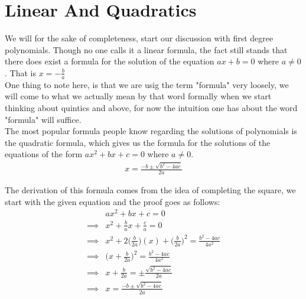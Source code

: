 
\begin{abstract}
The quadratic formula is very well known, slightly less well known are the formulas for the solutions of cubic and quartic equations. In this article we start by discussing the Sridharacharya's quadratic formula and show the proof for Del Ferro-Tartaglia-Cardano method for solving the cubic equation. We also discuss a method for solving quartics different than Ferrari's method. And we lastly we prove a weak Abel-Ruffini theorem which shows the non-existence of a general formula for the solutions of polynomials with degree higher than four. 
\end{abstract}

\articletoc


\section{Linear And Quadratics}

We will for the sake of completeness, start our discussion with first degree polynomials. Though no one calls it a linear formula, the fact still stands that there does exist a formula for the solution of the equation $ax+b=0$ where $a\neq 0$. That is $x=-\frac{b}{a}$\\

One thing to note here, is that we are usig the term "formula" very loosely, we will come to what we actually mean by that word formally when we start thinking about quintics and above, for now the intuition one has about the word "formula" will suffice.\\

The most popular formula people know regarding the solutions of polynomials is the quadratic formula, which gives us the formula for the solutions of the equations of the form $ax^2+bx+c=0$ where $a\neq 0$.\\
\begin{align*}
x=\frac{-b\pm\sqrt{b^2-4ac}}{2a}
\end{align*}

The derivation of this formula comes from the idea of completing the square, we start with the given equation and the proof goes as follows:
\begin{align*}
&ax^2+bx+c=0\\
\implies& x^2+\frac{b}{a}x+\frac{c}{a}=0\\
\implies& x^2+2\bigg(\frac{b}{2a}\bigg)(x)+\bigg(\frac{b}{2a}\bigg)^2=\frac{b^2-4ac}{4a^2}\\
\implies& \bigg(x+\frac{b}{2a}\bigg)^2=\frac{b^2-4ac}{4a^2}\\
\implies& x+\frac{b}{2a}=\pm\frac{\sqrt{b^2-4ac}}{2a}\\
\implies& x=\frac{-b\pm\sqrt{b^2-4ac}}{2a}
\end{align*} 

